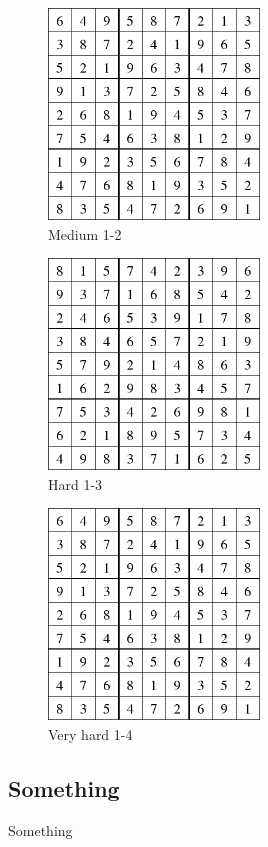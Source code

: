 \documentclass{article}
\begin{document}
	\begin{figure}[!htb]
		\caption{Medium 1-2}
		\centering
		\includegraphics[width=0.5\textwidth]{medium.png}
	\end{figure}
	\begin{figure}[!htb]
		\caption{Hard 1-3}
		\centering
		\includegraphics[width=0.5\textwidth]{hard.png}
	\end{figure}
	\begin{figure}[!htb]
		\caption{Very hard 1-4}
		\centering
		\includegraphics[width=0.5\textwidth]{medium.png}
	\end{figure}
\FloatBarrier
\subsection*{Something}
	Something
\end{document}
